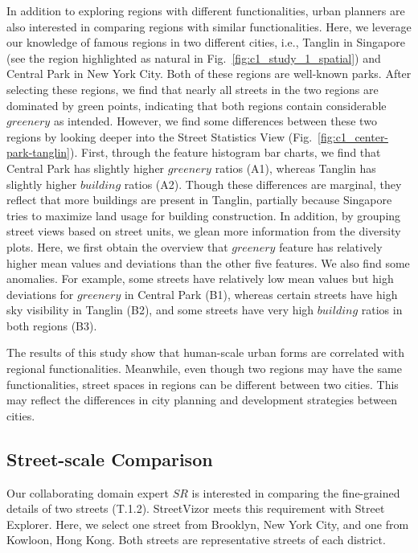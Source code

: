 In addition to exploring regions with different functionalities, urban planners are also interested in comparing regions with similar functionalities.
Here, we leverage our knowledge of famous regions in two different cities, i.e., Tanglin in Singapore (see the region highlighted as natural in Fig.~\ref{fig:c1_study_1_spatial}) and Central Park in New York City.
Both of these regions are well-known parks.
After selecting these regions, we find that nearly all streets in the two regions are dominated by green points, indicating that both regions contain considerable $greenery$ as intended.
However, we find some differences between these two regions by looking deeper into the Street Statistics View (Fig.~\ref{fig:c1_center-park-tanglin}).
First, through the feature histogram bar charts, we find that Central Park has slightly higher $greenery$ ratios (A1), whereas Tanglin has slightly higher $building$ ratios (A2).
Though these differences are marginal, they reflect that more buildings are present in Tanglin, partially because Singapore tries to maximize land usage for building construction.
In addition, by grouping street views based on street units, we glean more information from the diversity plots.
Here, we first obtain the overview that $greenery$ feature has relatively higher mean values and deviations than the other five features.
We also find some anomalies.
For example, some streets have relatively low mean values but high deviations for $greenery$ in Central Park (B1), whereas certain streets have high sky visibility in Tanglin (B2), and some streets have very high $building$ ratios in both regions (B3).

The results of this study show that human-scale urban forms are correlated with regional functionalities.
Meanwhile, even though two regions may have the same functionalities, street spaces in regions can be different between two cities.
This may reflect the differences in city planning and development strategies between cities.


\subsection{Street-scale Comparison}
Our collaborating domain expert $SR$ is interested in comparing the fine-grained details of two streets (T.1.2).
StreetVizor meets this requirement with Street Explorer.
Here, we select one street from Brooklyn, New York City, and one from Kowloon, Hong Kong.
Both streets are representative streets of each district.

